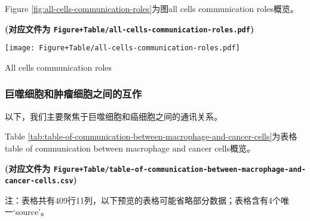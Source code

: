 \documentclass[
]{article}
\begin{document}
Figure \ref{fig:all-cells-communication-roles}为图all cells communication roles概览。

\textbf{(对应文件为 \texttt{Figure+Table/all-cells-communication-roles.pdf})}

\def\@captype{figure}
\begin{center}
\texttt{[image: Figure+Table/all-cells-communication-roles.pdf]}
\caption{All cells communication roles}\label{fig:all-cells-communication-roles}
\end{center}

\hypertarget{ux5de8ux566cux7ec6ux80deux548cux80bfux7624ux7ec6ux80deux4e4bux95f4ux7684ux4e92ux4f5c}{%
\subsubsection{巨噬细胞和肿瘤细胞之间的互作}\label{ux5de8ux566cux7ec6ux80deux548cux80bfux7624ux7ec6ux80deux4e4bux95f4ux7684ux4e92ux4f5c}}

以下，我们主要聚焦于巨噬细胞和癌细胞之间的通讯关系。

Table \ref{tab:table-of-communication-between-macrophage-and-cancer-cells}为表格table of communication between macrophage and cancer cells概览。

\textbf{(对应文件为 \texttt{Figure+Table/table-of-communication-between-macrophage-and-cancer-cells.csv})}

\begin{center}\begin{tcolorbox}[colback=gray!10, colframe=gray!50, width=0.9\linewidth, arc=1mm, boxrule=0.5pt]注：表格共有409行11列，以下预览的表格可能省略部分数据；表格含有4个唯一`source'。
\end{tcolorbox}
\end{center}
\end{document}
